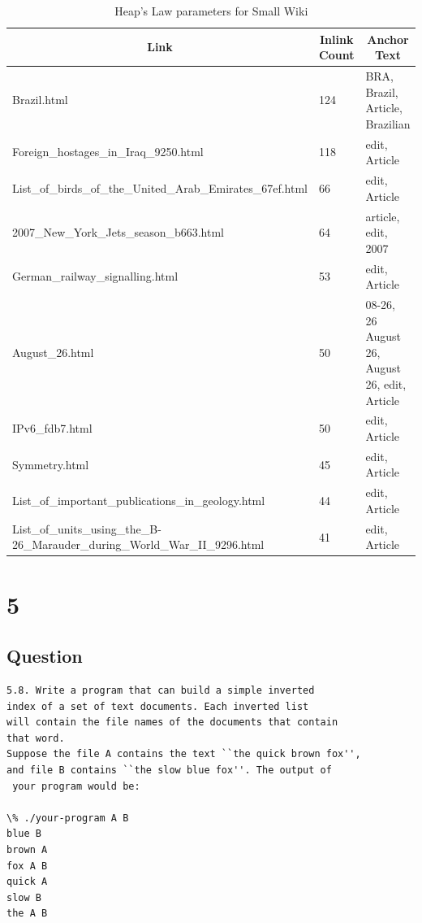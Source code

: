 \documentclass[letterpaper,11pt]{article}
\newcommand*{\srcPath}{../src}%
\begin{document}
\begin{table}
\begin{tabular}{| l | l | l |}
\hline
\multicolumn{1}{|c|}{\textbf{Link}} & \multicolumn{1}{c|}{\textbf{Inlink Count}} & \multicolumn{1}{c|}{\textbf{Anchor Text}}  \\ \hline
Brazil.html &124 & BRA, Brazil, Article, Brazilian \\ \hline
Foreign\_hostages\_in\_Iraq\_9250.html & 118 & edit, Article \\ \hline
List\_of\_birds\_of\_the\_United\_Arab\_Emirates\_67ef.html & 66 & edit, Article \\ \hline
2007\_New\_York\_Jets\_season\_b663.html & 64 & article, edit, 2007 \\ \hline
German\_railway\_signalling.html & 53 & edit, Article \\ \hline
August\_26.html & 50 & 08-26, 26 August 26, August 26, edit, Article \\ \hline
IPv6\_fdb7.html & 50 & edit, Article \\ \hline
Symmetry.html & 45 & edit, Article \\ \hline
List\_of\_important\_publications\_in\_geology.html & 44 & edit, Article \\ \hline
List\_of\_units\_using\_the\_B-26\_Marauder\_during\_World\_War\_II\_9296.html & 41 & edit, Article \\ \hline
\end{tabular}
\caption{Heap's Law parameters for Small Wiki}
\label{table:inlink}
\end{table}



\clearpage


\section*{5}

\subsection*{Question}

\begin{verbatim}
5.8. Write a program that can build a simple inverted 
index of a set of text documents. Each inverted list
will contain the file names of the documents that contain
that word.
Suppose the file A contains the text ``the quick brown fox'', 
and file B contains ``the slow blue fox''. The output of
 your program would be:

\% ./your-program A B
blue B
brown A
fox A B
quick A
slow B
the A B
\end{verbatim}
\end{document}
